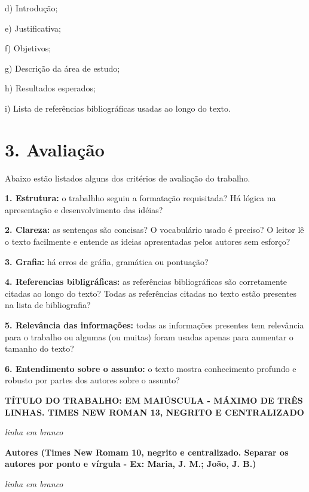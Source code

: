\documentclass[a4paper,10pt]{article}
\begin{document}
    d) Introdução;
    
    e) Justificativa;
    
    f) Objetivos;
    
    g) Descrição da área de estudo;
    
    h) Resultados esperados;
        
    i) Lista de referências bibliográficas usadas ao longo do texto. 
  
   \section* {3. Avaliação}
   \noindent
   
    Abaixo estão listados alguns dos critérios de avaliação do trabalho.
    
    \textbf{1. Estrutura:} o trabalhho seguiu a formatação requisitada? Há lógica na apresentação e desenvolvimento das idéias? 
    
    \textbf{2. Clareza:} as sentenças são concisas? O vocabulário usado é preciso? O leitor lê o texto facilmente e entende as ideias apresentadas pelos autores sem esforço?
    
    \textbf{3. Grafia:} há erros de gráfia, gramática ou pontuação? 
    
    \textbf{4. Referencias bibligráficas:} as referências bibliográficas são corretamente citadas ao longo do texto? Todas as referências citadas no texto estão presentes na lista de bibliografia? 
    
    \textbf{5. Relevância das informações:} todas as informações presentes tem relevância para o trabalho ou algumas (ou muitas) foram usadas apenas para aumentar o tamanho do texto? 
    
    \textbf{6. Entendimento sobre o assunto:} o texto mostra conhecimento profundo e robusto por partes dos autores sobre o assunto? 

\newpage %
   
  {\centering
  \textbf{TÍTULO DO TRABALHO: EM MAIÚSCULA - MÁXIMO DE TRÊS LINHAS. TIMES NEW ROMAN 13, NEGRITO E  CENTRALIZADO}
  
  \textit{linha em branco}
  
  \textbf{Autores (Times New Romam 10, negrito e centralizado. Separar os autores por ponto e vírgula - Ex: Maria, J. M.; João, J. B.)}
  
  \textit{linha em branco}
  
  \par
  }
  
\end{document}

